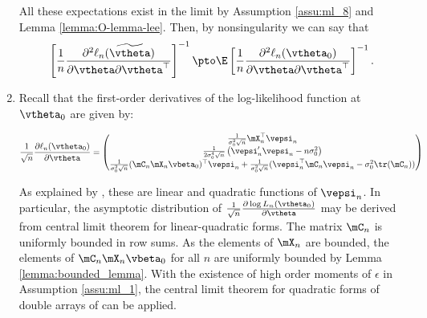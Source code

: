 \documentclass[english,12pt]{book}\usepackage[]{graphicx}\usepackage[]{xcolor}
\begin{document}
\begin{subappendices}
\begin{enumerate}
   All these expectations exist in the limit by Assumption \ref{assu:ml_8} and Lemma \ref{lemma:O-lemma-lee}. Then, by nonsingularity we can say that 
   \begin{equation*}
     \left[\frac{1}{n}\frac{\partial^2 \ell_n(\widetilde{\vtheta})}{\partial \vtheta \partial \vtheta^\top}\right]^{-1}\pto \E\left[\frac{1}{n}\frac{\partial^2 \ell_n(\vtheta_0)}{\partial \vtheta \partial \vtheta^\top}\right]^{-1}.
   \end{equation*}
   

   
   
   \item Recall that the first-order derivatives of the log-likelihood function at $\vtheta_0$ are given by:
   
  \begin{equation*}
   \frac{1}{\sqrt{n}}\frac{\partial \ell_n(\vtheta_0)}{\partial \vtheta} = \begin{pmatrix}
   \frac{1}{\sigma^2_0\sqrt{n}}\mX_n^\top\vepsi_n\\
   \frac{1}{2\sigma_0^4\sqrt{n}}\left(\vepsi_n'\vepsi_n - n\sigma_0^2\right) \\
   \frac{1}{\sigma_0^2\sqrt{n}}(\mC_n\mX_n\vbeta_0)^\top \vepsi_n + \frac{1}{\sigma_0^2\sqrt{n}}(\vepsi_n^\top\mC_n\vepsi_n - \sigma_0^2\tr(\mC_n))
   \end{pmatrix}
  \end{equation*}


As explained by \citet[][pag. 1905]{lee2004asymptotic}, these are linear and quadratic functions of $\vepsi_n$. In particular, the asymptotic distribution of $\frac{1}{\sqrt{n}}\frac{\partial \log L_n(\vtheta_0)}{\partial \vtheta}$ may be derived from central limit theorem for linear-quadratic forms. The matrix $\mC_n$ is uniformly bounded in row sums. As the elements of $\mX_n$ are bounded, the elements of $\mC_n\mX_n\vbeta_0$ for all $n$ are uniformly bounded by Lemma \ref{lemma:bounded_lemma}. With the existence of high order moments of $\epsilon$ in Assumption \ref{assu:ml_1}, the central limit theorem for quadratic forms of double arrays of \cite{kelejian2001asymptotic} can be applied. 


\end{enumerate}
\end{subappendices}
\end{document}
